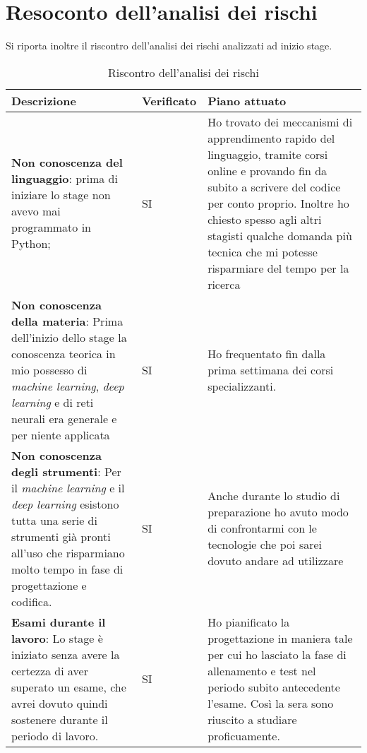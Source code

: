 \section{Resoconto dell'analisi dei rischi}
Si riporta inoltre il riscontro dell'analisi dei rischi analizzati ad inizio stage.
{
    \def\arraystretch{2}\tabcolsep=10pt
    
    \begin{table}[H]
        \small
        \begin{tabular}{ |p{4.5cm} |p{2cm} |p{4.5cm}|}
            \hline
            \textbf{Descrizione} & \textbf{Verificato} & \textbf{Piano attuato} \\ \hline
            \textbf{Non conoscenza del linguaggio}: prima di iniziare lo stage non avevo mai programmato in Python; &
            SI & 
            Ho trovato dei meccanismi di apprendimento rapido del linguaggio, tramite corsi online e provando fin da subito a scrivere del codice per conto proprio. Inoltre ho chiesto spesso agli altri stagisti qualche domanda più tecnica che mi potesse risparmiare del tempo per la ricerca \\
            \hline
            
            \textbf{Non conoscenza della materia}: Prima dell'inizio dello stage la conoscenza teorica in mio possesso di \textit{machine learning}, \textit{deep learning} e di reti neurali era generale e per niente applicata &
            SI &
            Ho frequentato fin dalla prima settimana dei corsi specializzanti. \\ 
            \hline
            
            \textbf{Non conoscenza degli strumenti}: Per il \textit{machine learning} e il \textit{deep learning} esistono tutta una serie di strumenti già pronti all'uso che risparmiano molto tempo in fase di progettazione e codifica. &
            SI &
            Anche durante lo studio di preparazione ho avuto modo di confrontarmi con le tecnologie che poi sarei dovuto andare ad utilizzare \\
            \hline
            \textbf{Esami durante il lavoro}: Lo stage è iniziato senza avere la certezza di aver superato un esame, che avrei dovuto quindi sostenere durante il periodo di lavoro. &
            SI &
            Ho pianificato la progettazione in maniera tale per cui ho lasciato la fase di allenamento e test nel periodo subito antecedente l'esame. Così la sera sono riuscito a studiare proficuamente. \\
            \hline
        \end{tabular}
        \caption{Riscontro dell'analisi dei rischi}
    \end{table}
}
